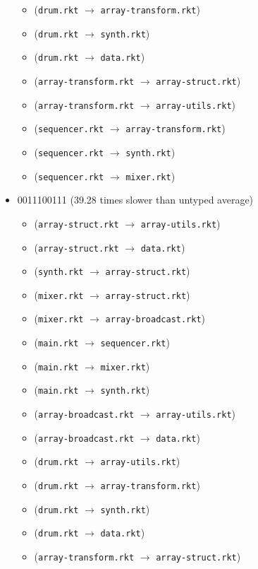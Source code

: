 \documentclass{article}
\newcommand{\mono}[1]{\texttt{#1}}
\begin{document}
\begin{itemize}
\begin{itemize}
  \item (\mono{drum.rkt} $\rightarrow$ \mono{array-transform.rkt})
  \item (\mono{drum.rkt} $\rightarrow$ \mono{synth.rkt})
  \item (\mono{drum.rkt} $\rightarrow$ \mono{data.rkt})
  \item (\mono{array-transform.rkt} $\rightarrow$ \mono{array-struct.rkt})
  \item (\mono{array-transform.rkt} $\rightarrow$ \mono{array-utils.rkt})
  \item (\mono{sequencer.rkt} $\rightarrow$ \mono{array-transform.rkt})
  \item (\mono{sequencer.rkt} $\rightarrow$ \mono{synth.rkt})
  \item (\mono{sequencer.rkt} $\rightarrow$ \mono{mixer.rkt})
  \end{itemize}
\item 0011100111 (39.28 times slower than untyped average)
  \begin{itemize}
  \item (\mono{array-struct.rkt} $\rightarrow$ \mono{array-utils.rkt})
  \item (\mono{array-struct.rkt} $\rightarrow$ \mono{data.rkt})
  \item (\mono{synth.rkt} $\rightarrow$ \mono{array-struct.rkt})
  \item (\mono{mixer.rkt} $\rightarrow$ \mono{array-struct.rkt})
  \item (\mono{mixer.rkt} $\rightarrow$ \mono{array-broadcast.rkt})
  \item (\mono{main.rkt} $\rightarrow$ \mono{sequencer.rkt})
  \item (\mono{main.rkt} $\rightarrow$ \mono{mixer.rkt})
  \item (\mono{main.rkt} $\rightarrow$ \mono{synth.rkt})
  \item (\mono{array-broadcast.rkt} $\rightarrow$ \mono{array-utils.rkt})
  \item (\mono{array-broadcast.rkt} $\rightarrow$ \mono{data.rkt})
  \item (\mono{drum.rkt} $\rightarrow$ \mono{array-utils.rkt})
  \item (\mono{drum.rkt} $\rightarrow$ \mono{array-transform.rkt})
  \item (\mono{drum.rkt} $\rightarrow$ \mono{synth.rkt})
  \item (\mono{drum.rkt} $\rightarrow$ \mono{data.rkt})
  \item (\mono{array-transform.rkt} $\rightarrow$ \mono{array-struct.rkt})

\end{itemize}
\end{itemize}
\end{document}
